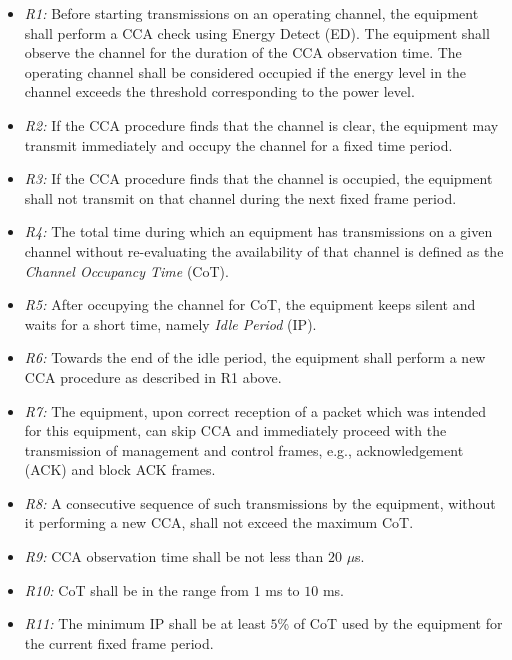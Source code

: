 \begin{itemize}
	
	\item
	\textit{R1:} Before starting transmissions on an operating channel, the equipment shall perform a CCA check using Energy Detect (ED). The equipment shall observe the channel for the duration of the CCA observation time. The operating channel shall be considered occupied if the energy level in the channel exceeds the threshold corresponding to the power level.
	
	\item
	\textit{R2:}
	If the CCA procedure finds that the channel is clear, the equipment may transmit immediately and occupy the channel for a fixed time period.
	
	\item
	\textit{R3:} If the CCA procedure finds that the channel is occupied, the equipment shall not transmit on that channel during the next fixed frame period.
	
	\item
	\textit{R4:} The total time during which an equipment has transmissions on a given channel without re-evaluating the availability of that channel is defined as the \textit{Channel Occupancy Time} (CoT).
	
	\item
	\textit{R5:} After occupying the channel for CoT, the equipment keeps silent and waits for a short time, namely \textit{Idle Period} (IP).
	
	\item
	\textit{R6:} Towards the end of the idle period, the equipment shall perform a new CCA procedure as described in R1 above.
	
	\item
	\textit{R7:} The equipment, upon correct reception of a packet which was intended for this equipment, can skip CCA and immediately proceed with the transmission of management and control frames, e.g., acknowledgement (ACK) and block ACK frames.
	
	\item
	\textit{R8:}
	A consecutive sequence of such transmissions by the equipment, without it performing a new CCA, shall not exceed the maximum CoT.
	
	\item
	\textit{R9:}
	CCA observation time shall be not less than $20$ $\mu$s.
	
	\item
	\textit{R10:} CoT shall be in the range from $1$ ms to $10$ ms.
	
	\item
	\textit{R11:}
	The minimum IP shall be at least $5$\% of CoT used by the equipment for the current fixed frame period.
	
\end{itemize}


